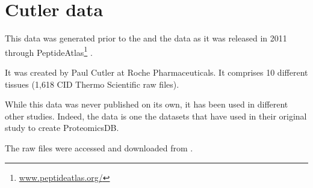 \chapter{Cutler data}
\label{ch:cutlerData}



This data was generated prior to the  and the 
data as it was released in 2011 through PeptideAtlas\footnote{%
\href{http://www.peptideatlas.org/}{www.peptideatlas.org/}}
\citep{PeptideAtlas}.

It was created by Paul Cutler at Roche Pharmaceuticals.
It comprises 10 different tissues (1,618 \gls{CID} Thermo Scientific raw files).

While this data was never published on its own, it has been used in different
other studies. Indeed, the  data is one the datasets that
\cite{KusterData} have used in their original study to create ProteomicsDB.

The raw files were accessed and downloaded from .


